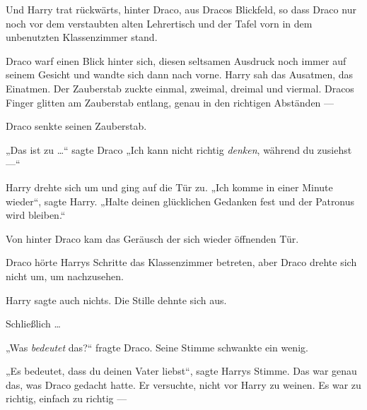 Und Harry trat rückwärts, hinter Draco, aus Dracos Blickfeld, so dass Draco nur noch vor dem verstaubten alten Lehrertisch und der Tafel vorn in dem unbenutzten Klassenzimmer stand.

Draco warf einen Blick hinter sich, diesen seltsamen Ausdruck noch immer auf seinem Gesicht und wandte sich dann nach vorne. Harry sah das Ausatmen, das Einatmen. Der Zauberstab zuckte einmal, zweimal, dreimal und viermal. Dracos Finger glitten am Zauberstab entlang, genau in den richtigen Abständen —

Draco senkte seinen Zauberstab.

„Das ist zu …“ sagte Draco
„Ich kann nicht richtig \emph{denken}, während du zusiehst —“

Harry drehte sich um und ging auf die Tür zu.
„Ich komme in einer Minute wieder“, sagte Harry.
„Halte deinen glücklichen Gedanken fest und der Patronus wird bleiben.“

\later

Von hinter Draco kam das Geräusch der sich wieder öffnenden Tür.

Draco hörte Harrys Schritte das Klassenzimmer betreten, aber Draco drehte sich nicht um, um nachzusehen.

Harry sagte auch nichts. Die Stille dehnte sich aus.

Schließlich …

„Was \emph{bedeutet} das?“ fragte Draco. Seine Stimme schwankte ein wenig.

„Es bedeutet, dass du deinen Vater liebst“, sagte Harrys Stimme. Das war genau das, was Draco gedacht hatte. Er versuchte, nicht vor Harry zu weinen. Es war zu richtig, einfach zu richtig —

